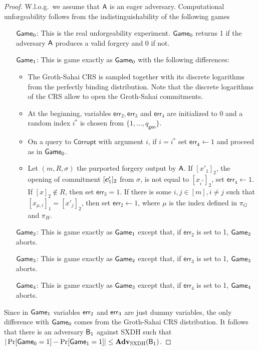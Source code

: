 \begin{proof}
W.l.o.g.~we assume that $\mathsf{A}$ is an eager adversary. Computational unforgeability follows from the indistinguishability of the following games
\begin{itemize}
\item[$\mathsf{Game}_0$:] This is the real unforgeability experiment. $\mathsf{Game}_0$ returns 1 if the adversary $\mathsf{A}$ produces a valid forgery and 0 if not.
\item[$\mathsf{Game}_1$:] This is game exactly as $\mathsf{Game}_0$ with the following differences: 
    \begin{itemize}
    \item The Groth-Sahai CRS is sampled together with its discrete logarithms from the perfectly binding distribution. Note that the discrete logarithms of the CRS allow to open the Groth-Sahai commitments.
    \item At the beginning, variables $\mathsf{err}_2,\mathsf{err}_3$ and $\mathsf{err}_4$ are initialized to $0$ and a random index $i^*$ is chosen from $\{1,\ldots, q_\mathsf{gen}\}$.
    \item On a query to $\mathsf{Corrupt}$ with argument $i$, if $i=i^*$ set $\mathsf{err_4}\gets 1$ and proceed as in $\mathsf{Game}_0$.
    \item Let $(m,R,\sigma)$ the purported forgery output by $\mathsf{A}$. If $[x'_1]_2$, the opening of commitment $[{\boldsymbol{c}}'_1]_2$ from $\sigma$, is not equal to $[x_{i^*}]_2$,  set $\mathsf{err}_4\gets 1$. If $[x]_2\notin R$, then set $\mathsf{err}_3=1$. If there is some $i,j\in[m],i\neq j$ such that $[x_{\mu,i}]_1=[x'_{j}]_2$, then set $\mathsf{err}_2\gets 1$, where $\mu$ is the index defined in $\pi_G$ and $\pi_H$.
    \end{itemize}
\item[$\mathsf{Game}_2$:] This is game exactly as $\mathsf{Game}_1$ except that, if $\mathsf{err}_2$ is set to 1, $\mathsf{Game}_2$ aborts.
\item[$\mathsf{Game}_3$:] This is game exactly as $\mathsf{Game}_2$ except that, if $\mathsf{err}_3$ is set to 1, $\mathsf{Game}_3$ aborts.
\item[$\mathsf{Game}_4$:] This is game exactly as $\mathsf{Game}_3$ except that, if $\mathsf{err}_4$ is set to 1, $\mathsf{Game}_4$ aborts. 
\end{itemize}
Since in $\mathsf{Game}_1$ variables $\mathsf{err}_2$ and $\mathsf{err}_3$ are just dummy variables, the only difference with $\mathsf{Game}_0$ comes from the Groth-Sahai CRS distribution. It follows that there is an adversary $\mathsf{B}_{1}$ against SXDH such that $|\Pr[\mathsf{Game}_0=1]-\Pr[\mathsf{Game}_1=1]|\leq \mathbf{Adv}_{\mathrm{SXDH}}(\mathsf{B}_{1})$.


\end{proof}
